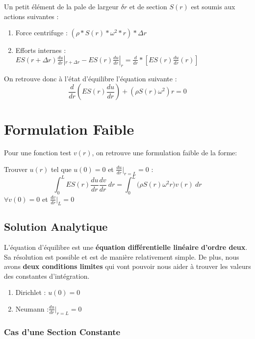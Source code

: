 \documentclass[a4paper,10pt]{report} %
\begin{document}
Un petit élément de la pale de largeur $\delta r$ et de section $S(r)$ est soumis aux actions suivantes :
\begin{enumerate}
	\item Force centrifuge : $(\rho*S(r)*\omega^2*r)*\Delta r$
	\item Efforts internes : $ES(r+\Delta r)\frac{du}{dr}|_{r+\Delta r}-ES(r)\frac{du}{dr}|_{r}=\frac{d}{dr}*[ES(r)\frac{du}{dr}(r)]$
\end{enumerate}


On retrouve donc à l'état d'équilibre l'équation suivante :
\begin{equation}
	\frac{d}{dr}(ES(r)\frac{du}{dr})+(\rho S(r)\omega^2)r =0
	\label{eqequilibre}
\end{equation}

\section{Formulation Faible}

Pour une fonction test $v(r)$, on retrouve une formulation faible de la forme:
\begin{center}
Trouver $u(r)$ tel que $u(0)=0$ et $\frac{du}{dr}\Big|_{r=L}=0$ :
	\begin{equation}
		\int_0^L \!ES(r)\frac{du}{dr}\frac{dv}{dr}~dr=\int_0^L \! \big(\rho S(r)\omega^2r\big)v(r)~dr
		\label{formulationfaible}
	\end{equation}
	$\forall v(0)=0$ et $\frac{dv}{dr}\big|_L=0$
\end{center}


\subsection{Solution Analytique}

L'équation d'équilibre est une \textbf{équation différentielle linéaire d'ordre deux}. Sa résolution est possible et est de manière relativement simple. De plus, nous avons \textbf{deux conditions limites} qui vont pouvoir nous aider à trouver les valeurs des constantes d'intégration.
\begin{enumerate}
	\item Dirichlet : $u(0)=0$
	\item Neumann :$\frac{du}{dr}\Big|_{r=L}=0$
\end{enumerate}

\subsubsection{Cas d'une Section Constante}
\end{document}
